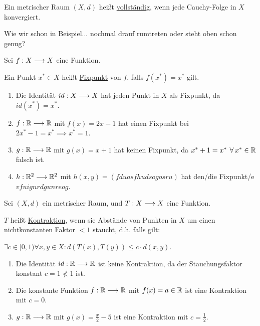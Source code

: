 \begin{definition}[vollständig]
    Ein metrischer Raum $(X, d)$ heißt \underline{vollständig}, wenn jede Cauchy-Folge in $X$ konvergiert.
\end{definition}

\begin{query}
    Wie wir schon in Beispiel... nochmal drauf rumtreten oder steht oben schon genug?
\end{query}

\begin{definition}[Fixpunkt]
    Sei $f: X \longrightarrow X$ eine Funktion.

    Ein Punkt $x^* \in X$ heißt \underline{Fixpunkt} von $f$, falls $f(x^*) = x^*$ gilt.
\end{definition}

\begin{example}
    \begin{enumerate}
        \item Die Identität $id: X \longrightarrow X$ hat jeden Punkt in $X$ als Fixpunkt, da $id(x^*) = x^*$.
        \item $f: \mathbb{R} \longrightarrow \mathbb{R}$ mit $f(x) = 2x - 1$ hat einen Fixpunkt bei $2x^* - 1 = x^* \implies x^* = 1$.
        \item $g: \mathbb{R} \longrightarrow \mathbb{R}$ mit $g(x) = x + 1$ hat keinen Fixpunkt, da $x^* + 1 = x^* \forall x^* \in \R$ falsch ist.
        \item $h: \mathbb{R}^2 \longrightarrow \mathbb{R}^2$ mit $h(x, y) = (fduosfhudsogosru)$ hat den/die Fixpunkt/e $vfuignrdgunreog$.
    \end{enumerate}
\end{example}

\begin{definition}[Kontraktion]
    \label{def-contraction-map}
    Sei $(X, d)$ ein metrischer Raum, und $T: X \longrightarrow X$ eine Funktion.

    $T$ heißt \underline{Kontraktion}, wenn sie Abstände von Punkten in $X$ um einen nichtkonstanten Faktor $<1$ staucht, d.h. falls gilt:

    $\exists c \in [0, 1) \forall x, y \in X: d(T(x), T(y)) \leq c \cdot d(x, y)$.
\end{definition}

\begin{example}
    \begin{enumerate}
        \item Die Identität $id: \mathbb{R} \longrightarrow \mathbb{R}$ ist keine Kontraktion, da der Stauchungsfaktor konstant $c=1 \nless 1$ ist.
        \item Die konstante Funktion $f: \mathbb{R} \longrightarrow \mathbb{R}$ mit $f(x) = a \in \mathbb{R}$ ist eine Kontraktion mit $c = 0$.
        \item $g: \mathbb{R} \longrightarrow \mathbb{R}$ mit $g(x) = \frac{x}{2} - 5$ ist eine Kontraktion mit $c = \frac{1}{2}$.
    \end{enumerate}
\end{example}

